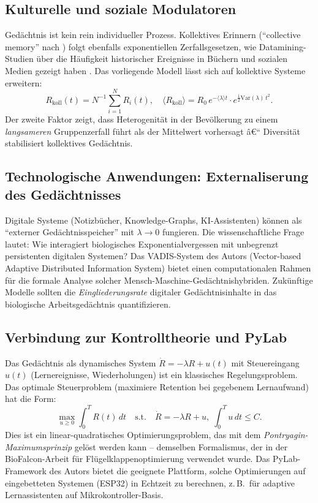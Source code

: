 ﻿\documentclass[12pt,a4paper,twoside]{article}
\theoremstyle{theormstyle}
\theoremstyle{proofstyle}
\begin{document}
	\subsection{Kulturelle und soziale Modulatoren}
	
	Gedächtnis ist kein rein individueller Prozess. Kollektives Erinnern
	(``collective memory'' nach \citealt{halbwachs1992}) folgt ebenfalls
	exponentiellen Zerfallsgesetzen, wie Datamining-Studien über die
	Häufigkeit historischer Ereignisse in Büchern und sozialen Medien
	gezeigt haben \citep{michel2011quantitative}.
	Das vorliegende Modell lässt sich auf kollektive Systeme erweitern:
	\[
	R_{\mathrm{koll}}(t) = N^{-1}\sum_{i=1}^N R_i(t),
	\quad \langle R_{\mathrm{koll}} \rangle = R_0\,e^{-\langle\lambda\rangle t}
	\cdot e^{\frac{1}{2}\mathrm{Var}(\lambda)\,t^2}.
	\]
	Der zweite Faktor zeigt, dass Heterogenität in der Bevölkerung
	zu einem \emph{langsameren} Gruppenzerfall führt als der Mittelwert
	vorhersagt â€“ Diversität stabilisiert kollektives Gedächtnis.
	
	\subsection{Technologische Anwendungen: Externaliserung des Gedächtnisses}
	
	Digitale Systeme (Notizbücher, Knowledge-Graphs, KI-Assistenten)
	können als ``externer Gedächtnisspeicher'' mit $\lambda \to 0$ fungieren.
	Die wissenschaftliche Frage lautet: Wie interagiert biologisches
	Exponentialvergessen mit unbegrenzt persistenten digitalen Systemen?
	Das VADIS-System des Autors \citep{epp2026vadis} (Vector-based Adaptive
	Distributed Information System) bietet einen computationalen Rahmen
	für die formale Analyse solcher Mensch-Maschine-Gedächtnishybriden.
	Zukünftige Modelle sollten die \emph{Eingliederungsrate} digitaler
	Gedächtnisinhalte in das biologische Arbeitsgedächtnis quantifizieren.
	
	\subsection{Verbindung zur Kontrolltheorie und PyLab}
	
	Das Gedächtnis als dynamisches System $\dot{R} = -\lambda R + u(t)$
	mit Steuereingang $u(t)$ (Lernereignisse, Wiederholungen) ist ein
	klassisches Regelungsproblem. Das optimale Steuerproblem
	(maximiere Retention bei gegebenem Lernaufwand) hat die Form:
	\[
	\max_{u \geq 0}\int_0^T R(t)\,dt
	\quad\text{s.t.}\quad \dot{R} = -\lambda R + u,\;
	\int_0^T u\,dt \leq C.
	\]
	Dies ist ein linear-quadratisches Optimierungsproblem, das mit
	dem \emph{Pontryagin-Maxi\-mumsprinzip} gelöst werden kann -- demselben
	Formalismus, der in der BioFalcon-Arbeit \citep{epp2026biofalcon}
	für Flügelklappenoptimierung verwendet wurde. Das PyLab-Framework des
	Autors bietet die geeignete Plattform, solche Optimierungen auf
	eingebetteten Systemen (ESP32) in Echtzeit zu berechnen, z.\,B.\ für
	adaptive Lernassistenten auf Mikrokontroller-Basis.
	
\end{document}
